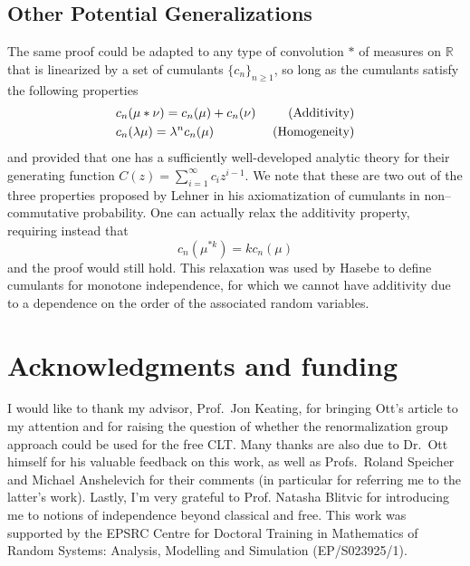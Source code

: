 \documentclass{amsart}
\theoremstyle{definition}
\theoremstyle{remark}
\numberwithin{equation}{section}
\begin{document}
\subsection{Other Potential Generalizations} The same proof could be adapted to any type of convolution $*$ of measures on $\mathbb{R}$ that is linearized by a set of cumulants $\{c_n\}_{n\geq 1}$, so long as the cumulants satisfy the following properties
\begin{align*}
    &c_n({\mu*\nu}) = c_n(\mu)+c_n({\nu}) &\mbox{ \text{(Additivity)}}\\
    &c_n{(\lambda \mu)} = \lambda^nc_n(\mu) &\mbox{ \text{(Homogeneity)}}
\end{align*}
and provided that one has a sufficiently well-developed analytic theory for their generating function $C(z)=\sum_{i=1}^\infty c_i z^{i-1}$. We note that these are two out of the three properties proposed by Lehner \cite{Lehner} in his axiomatization of cumulants in non--commutative probability. One can actually relax the additivity property, requiring instead that
\[  
    c_n(\mu^{*k})=kc_n(\mu)
\]
and the proof would still hold. This relaxation was used by Hasebe \cite{hasebeCumulants} to define cumulants for monotone independence, for which we cannot have additivity due to a dependence on the order of the associated random variables. 

\section*{Acknowledgments and funding}

I would like to thank my advisor, Prof.\ Jon Keating, for bringing Ott's article to my attention and for raising the question of whether the renormalization group approach could be used for the free CLT. Many thanks are also due to Dr.\ Ott himself for his valuable feedback on this work, as well as Profs.\ Roland Speicher and Michael Anshelevich for their comments (in particular for referring me to the latter's work). 
Lastly, I'm very grateful to Prof. Natasha Blitvic for introducing me to notions of independence beyond classical and free. This work was supported by the EPSRC Centre for Doctoral Training in Mathematics of Random Systems: Analysis, Modelling and Simulation (EP/S023925/1).



\nocite{*}


\end{document}

